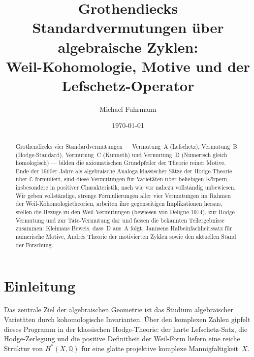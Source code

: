 \documentclass[12pt,a4paper]{amsart}
\theoremstyle{definition}
\newcommand{\Q}{\mathbb{Q}}
\begin{document}

\title{Grothendiecks Standardvermutungen \"uber algebraische Zyklen:\\
       Weil-Kohomologie, Motive und der Lefschetz-Operator}

\author{Michael Fuhrmann}
\address{Specialist Mathematics Project, Build 170}
\date{\today}

\begin{abstract}
Grothendiecks vier Standardvermutungen --- Vermutung~A (Lefschetz),
Vermutung~B (Hodge-Standard), Vermutung~C (K\"unneth) und Vermutung~D
(Numerisch gleich homologisch) --- bilden die axiomatischen Grundpfeiler
der Theorie reiner Motive.  Ende der 1960er Jahre als algebraische Analoga
klassischer Sätze der Hodge-Theorie über $\mathbb{C}$ formuliert, sind diese
Vermutungen für Varietäten über beliebigen Körpern, insbesondere in positiver
Charakteristik, nach wie vor nahezu vollständig unbewiesen.  Wir geben
vollständige, strenge Formulierungen aller vier Vermutungen im Rahmen
der Weil-Kohomologietheorien, arbeiten ihre gegenseitigen Implikationen heraus,
stellen die Bezüge zu den Weil-Vermutungen (bewiesen von Deligne 1974),
zur Hodge-Vermutung und zur Tate-Vermutung dar und fassen die bekannten
Teilergebnisse zusammen: Kleimans Beweis, dass~D aus~A folgt, Jannsens
Halbeinfachheitssatz für numerische Motive, Andrés Theorie der motivierten Zyklen
sowie den aktuellen Stand der Forschung.
\end{abstract}

\maketitle

\tableofcontents

\section{Einleitung}

Das zentrale Ziel der algebraischen Geometrie ist das Studium algebraischer
Varietäten durch kohomologische Invarianten.  Über den komplexen Zahlen
gipfelt dieses Programm in der klassischen Hodge-Theorie: der harte
Lefschetz-Satz, die Hodge-Zerlegung und die positive Definitheit der
Weil-Form liefern eine reiche Struktur von $H^*(X,\Q)$ für eine glatte
projektive komplexe Mannigfaltigkeit~$X$.
\end{document}
